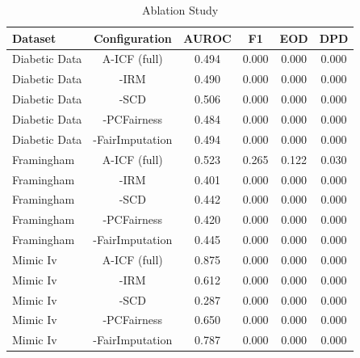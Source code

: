 \begin{table}[H]
\centering
\caption{Ablation Study}
\label{tab:ablation}
\begin{tabular}{lccccc}
\toprule
Dataset & Configuration & AUROC & F1 & EOD & DPD \\
\midrule
Diabetic Data & A-ICF (full) & 0.494 & 0.000 & 0.000 & 0.000 \\
Diabetic Data & -IRM & 0.490 & 0.000 & 0.000 & 0.000 \\
Diabetic Data & -SCD & 0.506 & 0.000 & 0.000 & 0.000 \\
Diabetic Data & -PCFairness & 0.484 & 0.000 & 0.000 & 0.000 \\
Diabetic Data & -FairImputation & 0.494 & 0.000 & 0.000 & 0.000 \\
Framingham & A-ICF (full) & 0.523 & 0.265 & 0.122 & 0.030 \\
Framingham & -IRM & 0.401 & 0.000 & 0.000 & 0.000 \\
Framingham & -SCD & 0.442 & 0.000 & 0.000 & 0.000 \\
Framingham & -PCFairness & 0.420 & 0.000 & 0.000 & 0.000 \\
Framingham & -FairImputation & 0.445 & 0.000 & 0.000 & 0.000 \\
Mimic Iv & A-ICF (full) & 0.875 & 0.000 & 0.000 & 0.000 \\
Mimic Iv & -IRM & 0.612 & 0.000 & 0.000 & 0.000 \\
Mimic Iv & -SCD & 0.287 & 0.000 & 0.000 & 0.000 \\
Mimic Iv & -PCFairness & 0.650 & 0.000 & 0.000 & 0.000 \\
Mimic Iv & -FairImputation & 0.787 & 0.000 & 0.000 & 0.000 \\
\bottomrule
\end{tabular}
\end{table}
